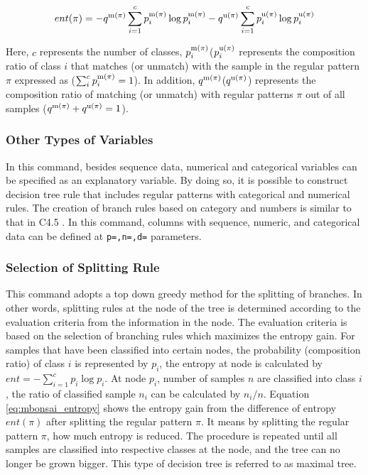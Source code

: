 \begin{equation}
ent(\pi)=-q^{{\rm m}(\pi)}\sum_{i=1}^c p_i^{{\rm m}(\pi)} \log p_i^{{\rm m}(\pi)}
            -q^{{\rm u}(\pi)}\sum_{i=1}^c p_i^{{\rm u}(\pi)} \log p_i^{{\rm u}(\pi)}
\label{eq:mbonsai_entropy}
\end{equation}

Here, $c$ represents the number of classes, $p_i^{{\rm m}(\pi)}$($p_i^{{\rm u}(\pi)}$ represents the composition ratio of class $i$ that matches (or unmatch) with the sample in the regular pattern $\pi$ expressed as ($\sum_i^c p_i^{{\rm m}(\pi)}=1$). In addition, $q^{{\rm m}(\pi)}$($q^{{\rm u}(\pi)}$) represents the composition ratio of matching (or unmatch) with regular patterns $\pi$ out of all samples ($q^{{\rm m}(\pi)}+q^{{\rm u}(\pi)}=1$).
 

\subsubsection{Other Types of Variables}
In this command, besides sequence data, numerical and categorical variables can be specified as an explanatory variable. By doing so, it is possible to construct decision tree rule that includes regular patterns with categorical and numerical rules. The creation of branch rules based on category and numbers is similar to that in C4.5 \cite{Quinlan93}. In this command, columns with sequence, numeric, and categorical data can be defined at \verb|p=,n=,d=| parameters. 


\subsubsection{Selection of Splitting Rule }
This command adopts a top down greedy method for the splitting of branches.  In other words, splitting rules at the node of the tree is determined according to the evaluation criteria from the information in the node. The evaluation criteria is based on the selection of branching rules which maximizes the entropy gain. For samples that have been classified into certain nodes, the probability (composition ratio) of class $i$ is represented by $p_i$, the entropy at node is calculated by $ent=-\sum_{i=1}^c p_i \log{p_i}$.  At node $p_i$, number of samples $n$ are classified into class $i$, the ratio of classified sample $n_i$ can be calculated by $n_i/n$. Equation \ref{eq:mbonsai_entropy} shows the entropy gain from the difference of entropy $ent(\pi)$ after splitting the regular pattern $\pi$. It means by splitting the regular pattern $\pi$, how much entropy is reduced. The procedure is repeated until all samples are classified into respective classes at the node, and the tree can no longer be grown bigger.  This type of decision tree is referred to as maximal tree.


